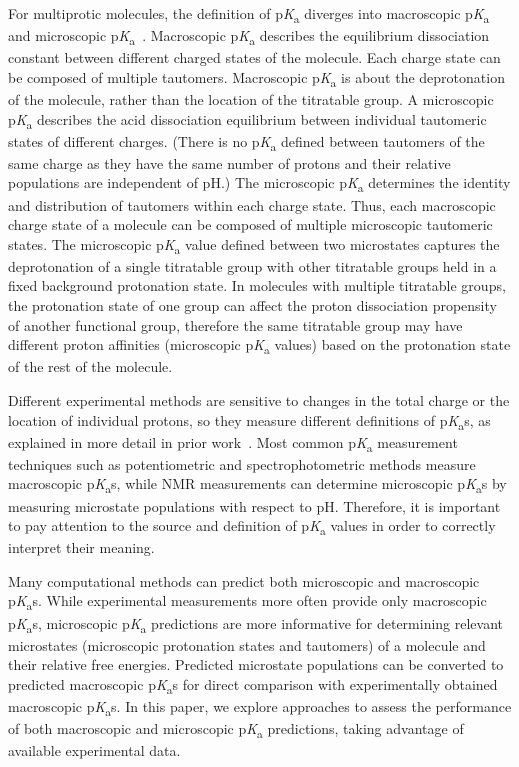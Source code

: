 \documentclass[9pt,lineno,final]{elife}
\newcommand{\pKa}{p\textit{K}\textsubscript{a}}
\begin{document}
For multiprotic molecules, the definition of \pKa{} diverges into macroscopic \pKa{} and microscopic \pKa{}~\citep{Darvey:1995:Biochem.Educ., Bodner:1986:J.Chem.Educ., Murray:1995:Anal.Chem.}. 
Macroscopic \pKa{} describes the equilibrium dissociation constant between different charged states of the molecule. 
Each charge state can be composed of multiple tautomers. 
Macroscopic \pKa{} is about the deprotonation of the molecule, rather than the location of the titratable group. 
A microscopic \pKa{} describes the acid dissociation equilibrium between individual tautomeric states of different charges. 
(There is no \pKa{} defined between tautomers of the same charge as they have the same number of protons and their relative populations are independent of pH.)
The microscopic \pKa{} determines the identity and distribution of tautomers within each charge state.
Thus, each macroscopic charge state of a molecule can be composed of multiple microscopic tautomeric states.
The microscopic \pKa{} value defined between two microstates captures the deprotonation of a single titratable group with other titratable groups held in a fixed background protonation state. 
In molecules with multiple titratable groups, the protonation state of one group can affect the proton dissociation propensity of another functional group, therefore the same titratable group may have different proton affinities (microscopic \pKa{} values) based on the protonation state of the rest of the molecule.

Different experimental methods are sensitive to changes in the total charge or the location of individual protons, so they measure different definitions of \pKa{}s, as explained in more detail in prior work~\citep{Isik:2018:J.Comput.AidedMol.Des.}. 
Most common \pKa{} measurement techniques such as potentiometric and spectrophotometric methods measure macroscopic \pKa{}s, while NMR measurements can determine microscopic \pKa{}s by measuring microstate populations with respect to pH. 
Therefore, it is important to pay attention to the source and definition of \pKa{} values in order to correctly interpret their meaning. 

Many computational methods can predict both microscopic and macroscopic \pKa{}s. While experimental measurements more often provide only macroscopic \pKa{}s,  microscopic \pKa{} predictions are more informative for determining relevant microstates (microscopic protonation states and tautomers) of a molecule and their relative free energies. 
Predicted microstate populations can be converted to predicted macroscopic \pKa{}s for direct comparison with experimentally obtained macroscopic \pKa{}s. 
In this paper, we explore approaches to assess the performance of both macroscopic and microscopic \pKa{} predictions, taking advantage of available experimental data.
\end{document}
